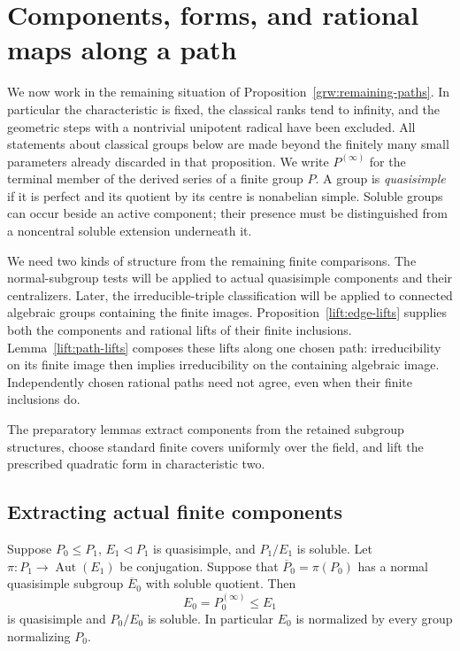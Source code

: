 \section{Components, forms, and rational maps along a path}
\label{lift:section}

We now work in the remaining situation of Proposition~\ref{grw:remaining-paths}.
In particular the characteristic is fixed, the classical ranks tend to infinity,
and the geometric steps with a nontrivial unipotent radical have been excluded.
All statements about classical groups below are made beyond the finitely many
small parameters already discarded in that proposition.  We write
$P^{(\infty)}$ for the terminal member of the derived series of a finite group
$P$.  A group is \emph{quasisimple} if it is perfect and its quotient by its
centre is nonabelian simple.  Soluble groups can occur beside an active
component; their presence must be distinguished from a noncentral soluble
extension underneath it.

We need two kinds of structure from the remaining finite comparisons.
The normal-subgroup tests will be applied to actual quasisimple components
and their centralizers.  Later, the irreducible-triple classification will
be applied to connected algebraic groups containing the finite images.
Proposition~\ref{lift:edge-lifts} supplies both the components and rational
lifts of their finite inclusions.  Lemma~\ref{lift:path-lifts} composes
these lifts along one chosen path: irreducibility on its finite image
then implies irreducibility on the containing algebraic image.
Independently chosen rational paths need not agree, even when their
finite inclusions do.

The preparatory lemmas extract components from the retained subgroup
structures, choose standard finite covers uniformly over the field,
and lift the prescribed quadratic form in characteristic two.

\subsection{Extracting actual finite components}

\begin{lemma}\label{lift:component-preimage}
Suppose $P_0\leq P_1$, $E_1\lhd P_1$ is quasisimple, and $P_1/E_1$ is
soluble.  Let $\pi:P_1\longrightarrow\operatorname{Aut}(E_1)$ be conjugation.
Suppose that $\overline P_0=\pi(P_0)$ has a normal quasisimple subgroup
$\overline E_0$ with soluble quotient.  Then
\[
 E_0=P_0^{(\infty)}\leq E_1
\]
is quasisimple and $P_0/E_0$ is soluble.  In particular $E_0$ is normalized
by every group normalizing $P_0$.
\end{lemma}

